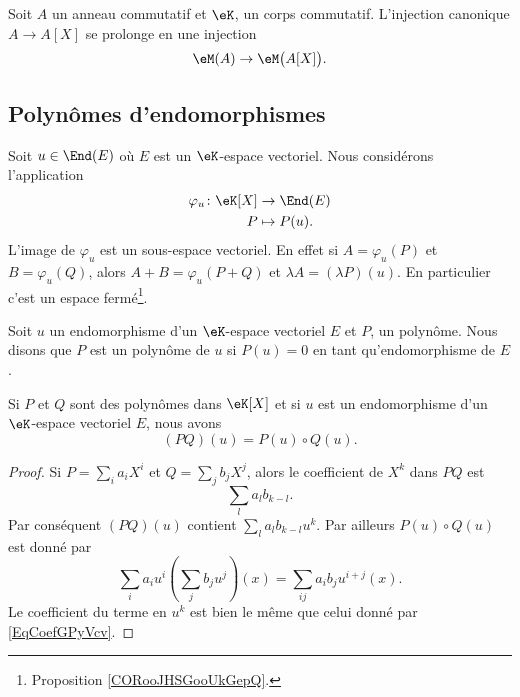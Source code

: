 Soit \( A\) un anneau commutatif et \( \eK\), un corps commutatif. L'injection canonique \( A\to A[X]\) se prolonge en une injection
\begin{equation}
	\eM(A)\to\eM\big( A[X] \big).
\end{equation}

\subsection{Polynômes d'endomorphismes}

Soit \( u\in\End(E)\) où \( E\) est un \( \eK\)-espace vectoriel. Nous considérons l'application
\begin{equation}    \label{EqOVKooeMJuv}
	\begin{aligned}
		\varphi_u\colon \eK[X] & \to \End(E)   \\
		P                      & \mapsto P(u).
	\end{aligned}
\end{equation}
L'image de \( \varphi_u\) est un sous-espace vectoriel. En effet si \( A=\varphi_u(P)\) et \( B=\varphi_u(Q)\), alors \( A+B=\varphi_u(P+Q)\) et \( \lambda A=(\lambda P)(u)\). En particulier c'est un espace fermé\footnote{Proposition \ref{CORooJHSGooUkGepQ}.}.

Soit \( u\) un endomorphisme d'un \( \eK\)-espace vectoriel \( E\) et \( P\), un polynôme. Nous disons que \( P\) est un polynôme  de \( u\) si \( P(u)=0\) en tant qu'endomorphisme de \( E\).

\begin{lemma}       \label{LemQWvhYb}
	Si \( P\) et \( Q\) sont des polynômes dans \( \eK[X]\) et si \( u\) est un endomorphisme d'un \( \eK\)-espace vectoriel \( E\), nous avons
	\begin{equation}
		(PQ)(u)=P(u)\circ Q(u).
	\end{equation}
\end{lemma}

\begin{proof}
	Si \( P=\sum_i a_iX^i\) et \( Q=\sum_j b_jX^j\), alors le coefficient de \( X^k\) dans \( PQ\) est
	\begin{equation}        \label{EqCoefGPyVcv}
		\sum_la_lb_{k-l}.
	\end{equation}
	Par conséquent \( (PQ)(u)\) contient \( \sum_la_lb_{k-l}u^k\). Par ailleurs \( P(u)\circ Q(u)\) est donné par
	\begin{equation}
		\sum_ia_iu^i\left( \sum_jb_ju^j \right)(x)=\sum_{ij}a_ib_ju^{i+j}(x).
	\end{equation}
	Le coefficient du terme en \( u^k\) est bien le même que celui donné par \eqref{EqCoefGPyVcv}.
\end{proof}

